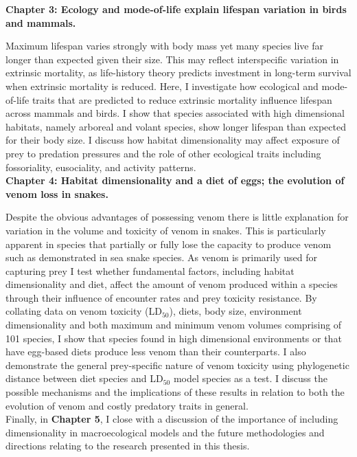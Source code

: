 \textbf{Chapter 3: Ecology and mode-of-life explain lifespan variation in birds and mammals.}


Maximum lifespan varies strongly with body mass yet many species live far longer than expected given their size. This may reflect interspecific variation in extrinsic mortality, as life-history theory predicts investment in long-term survival when extrinsic mortality is reduced. Here, I investigate how ecological and mode-of-life traits that are predicted to reduce extrinsic mortality influence lifespan across mammals and birds. I show that species associated with high dimensional habitats, namely arboreal and volant species, show longer lifespan than expected for their body size. I discuss how habitat dimensionality may affect exposure of prey to predation pressures and the role of other ecological traits including fossoriality, eusociality, and activity patterns.\\




\textbf{Chapter 4: Habitat dimensionality and a diet of eggs; the evolution of venom loss in snakes.}


Despite the obvious advantages of possessing venom there is little explanation for variation in the volume and toxicity of venom in snakes. This is particularly apparent in species that partially or fully lose the capacity to produce venom such as demonstrated in sea snake species. As venom is primarily used for capturing prey I test whether fundamental factors, including habitat dimensionality and diet, affect the amount of venom produced within a species through their influence of encounter rates and prey toxicity resistance. By collating data on venom toxicity (LD$_{50}$), diets, body size, environment dimensionality and both maximum and minimum venom volumes comprising of 101 species, I show that species found in high dimensional environments or that have egg-based diets produce less venom than their counterparts. I also demonstrate the general prey-specific nature of venom toxicity using phylogenetic distance between diet species and LD$_{50}$ model species as a test. I discuss the possible mechanisms and the implications of these results in relation to both the evolution of venom and costly predatory traits in general.\\

%
%
Finally, in \textbf{Chapter 5}, I close with a discussion of the importance of including dimensionality in macroecological models and the future methodologies and directions relating to the research presented in this thesis.


